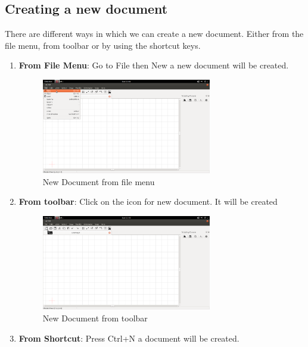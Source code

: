 \subsection{Creating a new document}
There are different ways in which we can create a new document. Either from the file menu, from toolbar or by using the shortcut keys. 
\begin{enumerate}
\item \textbf{From File Menu}:
Go to File then New a new document will be created. 
\begin{figure}[h!]
\centering
\includegraphics[width=0.7\textwidth]{images/filenew.png}
\caption{New Document from file menu}
\end{figure}
\item \textbf{From toolbar}:
Click on the icon for new document. It will be created
\begin{figure}[h!]
\centering
\includegraphics[width=0.7\textwidth]{images/toolnew.png}
\caption{New Document from toolbar}
\end{figure}
\item \textbf{From Shortcut}: Press Ctrl+N a document will be created.
\end{enumerate}
\newpage

